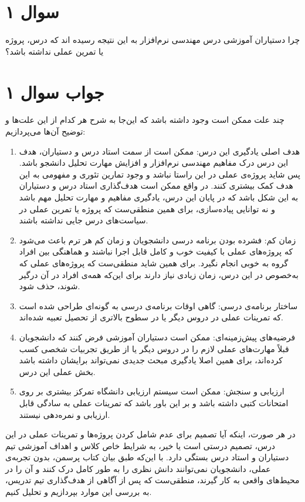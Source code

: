 \section*{سوال ۱}

چرا دستیاران آموزشی درس مهندسی نرم‌افزار به این نتیجه رسیده اند که درس، پروژه یا تمرین عملی نداشته باشد؟
\section*{جواب سوال ۱}

چند علت ممکن است وجود داشته باشد که این‌جا به شرح هر کدام از این علت‌ها و توضیح آن‌ها می‌پردازیم:

\begin{enumerate}
	\item هدف اصلی یادگیری این درس: ممکن است از سمت استاد درس و دستیاران، هدف این درس درک مفاهیم مهندسی نرم‌افزار و افزایش مهارت تحلیل دانشجو باشد. پس شاید پروژه‌ی عملی در این راستا نباشد و وجود تمارین تئوری و مفهومی به این هدف کمک بیشتری کنند. در واقع ممکن است هدف‌گذاری استاد درس و دستیاران به این شکل باشد که در پایان این درس، یادگیری مفاهیم و مهارت تحلیل مهم باشد و نه توانایی پیاده‌سازی، برای همین منطقی‌ست که پروژه یا تمرین عملی در سیاست‌های درس جایی نداشته باشند.
	
	\item زمان کم: فشرده بودن برنامه درسی دانشجویان و زمان کم هر ترم باعث می‌شود که پروژه‌های عملی با کیفیت خوب و کامل قابل اجرا نباشند و هماهنگی بین افراد گروه به خوبی انجام نگیرد. برای همین شاید منطقی‌ست که پروژه‌های عملی که به‌خصوص در این درس، زمان زیادی نیاز دارند برای این‌که همه‌ی افراد در آن درگیر شوند، حذف شود.
	
	\item ساختار برنامه‌ی درسی: گاهی اوقات برنامه‌ی درسی به گونه‌ای طراحی شده است که تمرینات عملی در دروس دیگر یا در سطوح بالاتری از تحصیل تعبیه شده‌اند.
	
	\item فرضیه‌های پیش‌زمینه‌ای: ممکن است دستیاران آموزشی فرض کنند که دانشجویان قبلاً مهارت‌های عملی لازم را در دروس دیگر یا از طریق تجربیات شخصی کسب کرده‌اند، برای همین اصلا یادگیری مبحث جدیدی نمی‌تواند برایشان داشته باشد بخش عملی این درس.
	
	\item ارزیابی و سنجش: ممکن است سیستم ارزیابی دانشگاه تمرکز بیشتری بر روی امتحانات کتبی داشته باشد و بر این باور باشد که تمرینات عملی به سادگی قابل ارزیابی و نمره‌دهی نیستند.
\end{enumerate}

در هر صورت، اینکه آیا تصمیم برای عدم شامل کردن پروژه‌ها و تمرینات عملی در این درس، تصمیم درستی است یا خیر، به شرایط خاص کلاس و اهداف آموزشی تیم دستیاران و استاد درس بستگی دارد. با این‌که طبق بیان کتاب پرسمن، بدون تجربه‌ی عملی، دانشجویان نمی‌توانند دانش نظری را به طور کامل درک کنند و آن را در محیط‌های واقعی به کار گیرند، منطقی‌ست که پس از آگاهی از هدف‌گذاری تیم تدریس، به بررسی این موارد بپردازیم و تحلیل کنیم.